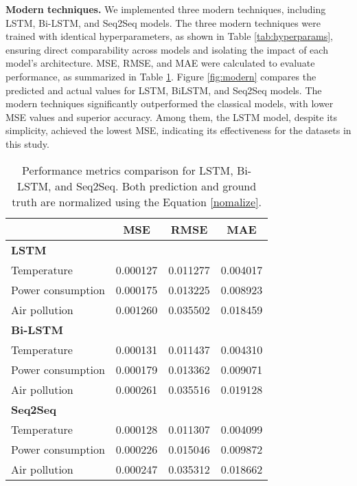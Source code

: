\documentclass[sn-mathphys-num]{sn-jnl}
\theoremstyle{thmstyleone}%
\theoremstyle{thmstyletwo}%
\theoremstyle{thmstylethree}%
\begin{document}
\textbf{Modern techniques.} 
We implemented three modern techniques, including LSTM, Bi-LSTM, and Seq2Seq models. The three modern techniques were trained with identical hyperparameters, as shown in Table \ref{tab:hyperparams}, ensuring direct comparability across models and isolating the impact of each model's architecture. MSE, RMSE, and MAE were calculated to evaluate performance, as summarized in Table \ref{tab:lstm_metric}. Figure \ref{fig:modern} compares the predicted and actual values for LSTM, BiLSTM, and Seq2Seq models. The modern techniques significantly outperformed the classical models, with lower MSE values and superior accuracy. Among them, the LSTM model, despite its simplicity, achieved the lowest MSE, indicating its effectiveness for the datasets in this study.

\begin{table}[h]
\centering
\begin{tabular}{@{}lccc@{}}
\toprule
\textbf{}               & \textbf{MSE} & \textbf{RMSE} & \textbf{MAE} \\ \midrule
\textbf{LSTM}           &              &               &              \\
Temperature             & 0.000127     & 0.011277      & 0.004017     \\
Power consumption       & 0.000175     & 0.013225      & 0.008923     \\
Air pollution           & 0.001260     & 0.035502      & 0.018459     \\ \midrule
\textbf{Bi-LSTM}        &              &               &              \\
Temperature             & 0.000131     & 0.011437      & 0.004310     \\
Power consumption       & 0.000179     & 0.013362      & 0.009071     \\
Air pollution           & 0.000261     & 0.035516      & 0.019128     \\ \midrule
\textbf{Seq2Seq}        &              &               &              \\
Temperature             & 0.000128     & 0.011307      & 0.004099     \\
Power consumption       & 0.000226     & 0.015046      & 0.009872     \\
Air pollution           & 0.000247     & 0.035312      & 0.018662       \\ \bottomrule
\end{tabular}
\caption{Performance metrics comparison for LSTM, Bi-LSTM, and Seq2Seq. Both prediction and ground truth are normalized using the Equation \ref{nomalize}.}
\label{tab:lstm_metric}
\end{table}
\end{document}
